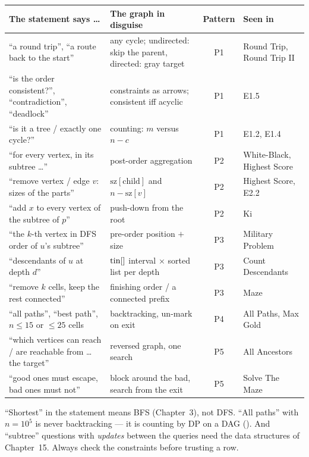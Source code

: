 \begin{center}
\small
\renewcommand{\arraystretch}{1.35}
\begin{tabularx}{\linewidth}{@{}>{\raggedright\arraybackslash}p{4.7cm} >{\raggedright\arraybackslash}X c >{\raggedright\arraybackslash}p{2.6cm}@{}}
\toprule
\textbf{The statement says \dots} & \textbf{The graph in disguise} & \textbf{Pattern} & \textbf{Seen in} \\
\midrule
``a round trip'', ``a route back to the start'' & any cycle; undirected: skip the parent, directed: gray target & P1 & Round Trip, Round Trip II \\
``is the order consistent?'', ``contradiction'', ``deadlock'' & constraints as arrows; consistent iff acyclic & P1 & E1.5 \\
``is it a tree / exactly one cycle?'' & counting: $m$ versus $n - c$ & P1 & E1.2, E1.4 \\
``for every vertex, in its subtree \dots'' & post-order aggregation & P2 & White-Black, Highest Score \\
``remove vertex / edge $v$: sizes of the parts'' & $\mathrm{sz}[\text{child}]$ and $n - \mathrm{sz}[v]$ & P2 & Highest Score, E2.2 \\
``add $x$ to every vertex of the subtree of $p$'' & push-down from the root & P2 & Ki \\
``the $k$-th vertex in DFS order of $u$'s subtree'' & pre-order position $+$ size & P3 & Military Problem \\
``descendants of $u$ at depth $d$'' & $\mathrm{tin}[]$ interval $\times$ sorted list per depth & P3 & Count Descendants \\
``remove $k$ cells, keep the rest connected'' & finishing order / a connected prefix & P3 & Maze \\
``all paths'', ``best path'', $n \le 15$ or $\le 25$ cells & backtracking, un-mark on exit & P4 & All Paths, Max Gold \\
``which vertices can reach / are reachable from \dots{} the target'' & reversed graph, one search & P5 & All Ancestors \\
``good ones must escape, bad ones must not'' & block around the bad, search from the exit & P5 & Solve The Maze \\
\bottomrule
\end{tabularx}
\end{center}

\begin{warningbox}
``Shortest'' in the statement means BFS (Chapter~3), not DFS. ``All paths'' with $n = 10^5$ is never backtracking --- it is counting by DP on a DAG (). And ``subtree'' questions with \emph{updates} between the queries need the data structures of Chapter~15. Always check the constraints before trusting a row.
\end{warningbox}

